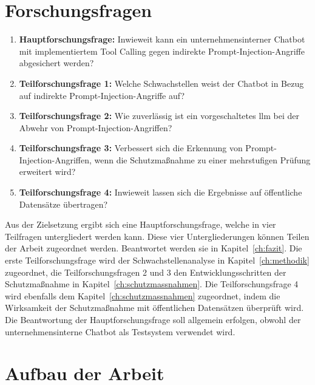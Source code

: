 \section{Forschungsfragen}

\begin{enumerate}
    \item \textbf{Hauptforschungsfrage:} Inwieweit kann ein unternehmensinterner Chatbot mit implementiertem Tool Calling gegen indirekte Prompt-Injection-Angriffe abgesichert werden?
    \item \textbf{Teilforschungsfrage 1:} Welche Schwachstellen weist der Chatbot in Bezug auf indirekte Prompt-Injection-Angriffe auf?
    \item \textbf{Teilforschungsfrage 2:} Wie zuverlässig ist ein vorgeschaltetes \ac{llm} bei der Abwehr von Prompt-Injection-Angriffen?
    \item \textbf{Teilforschungsfrage 3:} Verbessert sich die Erkennung von Prompt-Injection-Angriffen, wenn die Schutzmaßnahme zu einer mehrstufigen Prüfung erweitert wird?
    \item \textbf{Teilforschungsfrage 4:} Inwieweit lassen sich die Ergebnisse auf öffentliche Datensätze übertragen?
\end{enumerate}

Aus der Zielsetzung ergibt sich eine Hauptforschungsfrage, welche in vier Teilfragen untergliedert werden kann. Diese vier Untergliederungen können Teilen der
Arbeit zugeordnet werden. Beantwortet werden sie in Kapitel~\ref{ch:fazit}. Die erste Teilforschungsfrage wird der Schwachstellenanalyse in Kapitel~\ref{ch:methodik}
zugeordnet, die Teilforschungsfragen 2 und 3 den Entwicklungsschritten der Schutzmaßnahme in Kapitel~\ref{ch:schutzmassnahmen}. Die Teilforschungsfrage 4 wird ebenfalls
dem Kapitel~\ref{ch:schutzmassnahmen} zugeordnet, indem die Wirksamkeit der Schutzmaßnahme mit öffentlichen Datensätzen überprüft wird. \\
Die Beantwortung der Hauptforschungsfrage soll allgemein erfolgen, obwohl der unternehmensinterne Chatbot als Testsystem verwendet wird.

\section{Aufbau der Arbeit}

